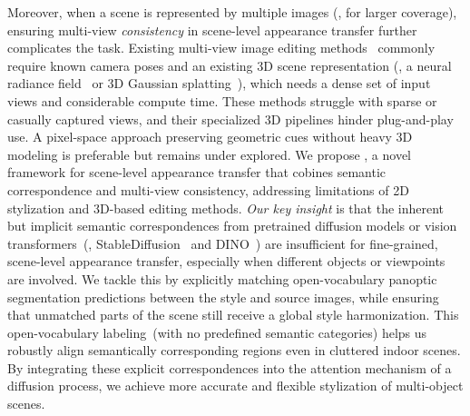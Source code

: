 Moreover, when a scene is represented by multiple images (\eg, for larger coverage), ensuring multi-view \emph{consistency} in scene-level appearance transfer further complicates the task.
Existing multi-view image editing methods~\cite{or24mvedit,styleGaussians,fujiwara2024sn2n,vicanerf2023} commonly require known camera poses and an existing 3D scene representation (\eg, a neural radiance field~\cite{mildenhall2021nerf} or 3D Gaussian splatting~\cite{kerbl20233d}), which needs a dense set of input views and considerable compute time. 
These methods struggle with sparse or casually captured views, and their specialized 3D pipelines hinder plug-and-play use.
A pixel-space approach preserving geometric cues without heavy 3D modeling is preferable but remains under explored. 
We propose \textbf{\ours}, a novel framework for scene-level appearance transfer that cobines semantic correspondence and multi-view consistency, addressing limitations of 2D stylization and 3D-based editing methods.
\emph{Our key insight} is that the inherent but implicit semantic correspondences from pretrained diffusion models or vision transformers~(\eg, StableDiffusion~\cite{rombach2022latentdiffusion} and DINO~\cite{caron2021dino, oquab2023dinov2}) are insufficient for fine-grained, scene-level appearance transfer, especially when different objects or viewpoints are involved.
We tackle this by explicitly matching open-vocabulary panoptic segmentation predictions between the style and source images, while ensuring that unmatched parts of the scene still receive a global style harmonization.
This open-vocabulary labeling~(with no predefined semantic categories) helps us robustly align semantically corresponding regions even in cluttered indoor scenes.
By integrating these explicit correspondences into the attention mechanism of a diffusion process, we achieve more accurate and flexible stylization of multi-object scenes.

